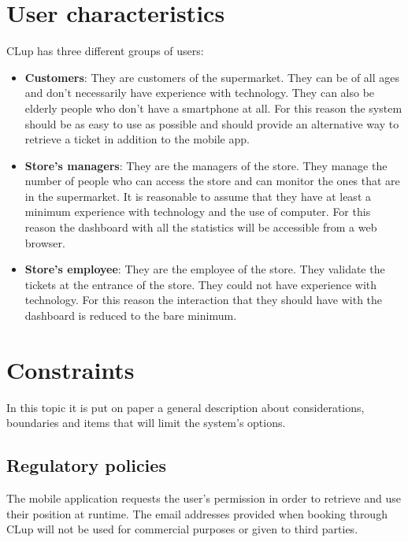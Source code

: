 \section{User characteristics}
CLup has three different groups of users:
\begin{itemize}
	\item \textbf{Customers}: They are customers of the supermarket. They can be of all ages and don't necessarily have experience with technology. They can also be elderly 
	people who don't have a smartphone at all. For this reason the system should be as easy to use as possible and should provide an alternative way to retrieve a ticket in
	addition to the mobile app.  
	\item \textbf{Store's managers}: They are the managers of the store. They manage the number of people who can access the store and can monitor the ones that
	are in the supermarket. It is reasonable to assume that they have at least a minimum experience with technology and the use of computer. For this reason the dashboard
	with all the statistics will be accessible from a web browser.
	\item \textbf{Store's employee}: They are the employee of the store. They validate the tickets at the entrance of the store. They could not have experience
	with technology. For this reason the interaction that they should have with the dashboard is reduced to the bare minimum.
\end{itemize} 

\section{Constraints}
In this topic it is put on paper a general description about considerations, boundaries and items that will limit the system's options.

\subsection{Regulatory policies}
The mobile application requests the user's permission in order to retrieve and use their position at runtime. The email addresses provided when booking through CLup will not be used for commercial purposes or given to third parties.

